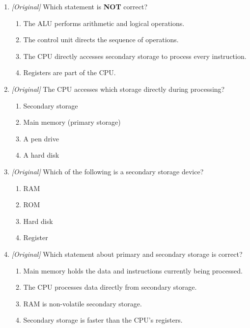 \documentclass[11pt]{article}
\begin{document}
\begin{enumerate}[label=\textbf{Q\arabic*.}, leftmargin=*]
\begin{enumerate}[label=\Alph*.]
    \item Program data between the CPU and memory
    \item Control and timing signals between the CPU and other units
    \item Only input data from the keyboard
  \end{enumerate}
\item \textit{[Original]} Which statement is \textbf{NOT} correct?
  \begin{enumerate}[label=\Alph*.]
    \item The ALU performs arithmetic and logical operations.
    \item The control unit directs the sequence of operations.
    \item The CPU directly accesses secondary storage to process every
      instruction.
    \item Registers are part of the CPU.
  \end{enumerate}
\item \textit{[Original]} The CPU accesses which storage directly during
  processing?
  \begin{enumerate}[label=\Alph*.]
    \item Secondary storage
    \item Main memory (primary storage)
    \item A pen drive
    \item A hard disk
  \end{enumerate}
\item \textit{[Original]} Which of the following is a secondary storage
  device?
  \begin{enumerate}[label=\Alph*.]
    \item RAM
    \item ROM
    \item Hard disk
    \item Register
  \end{enumerate}
\item \textit{[Original]} Which statement about primary and secondary storage
  is correct?
  \begin{enumerate}[label=\Alph*.]
    \item Main memory holds the data and instructions currently being
      processed.
    \item The CPU processes data directly from secondary storage.
    \item RAM is non-volatile secondary storage.
    \item Secondary storage is faster than the CPU's registers.

\end{enumerate}
\end{enumerate}
\end{document}
